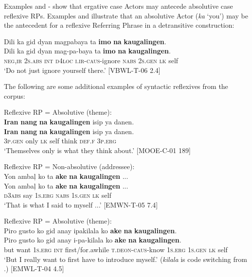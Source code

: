 Examples  and - show that ergative case Actors may antecede absolutive case reflexive RPs. Examples  and  illustrate that an absolutive Actor (\textit{ka} ‘you’) may be the antecedent for a reflexive Referring Phrase in a detransitive construction:


\ea
\label{bkm:Ref501865097}
Dili  ka  gid  dyan  magpabaya  ta  \textbf{imo}  \textbf{na}  \textbf{kaugalingen}. \\\smallskip
\gll Dili  ka  gid  dyan  mag-pa-baya  ta  \textbf{imo}  \textbf{na}  \textbf{kaugalingen}. \\
\textsc{neg,ir}  2\textsc{s.abs}  \textsc{int}  \textsc{d}4\textsc{loc}  \textsc{i.ir}-\textsc{caus}-ignore  \textsc{nabs}  2\textsc{s.gen}  \textsc{lk}  self \\
\glt ‘Do not just ignore yourself there.’ [VBWL-T-06 2.4]
\z

The following are some additional examples of syntactic reflexives from the corpus:

\ea
\label{bkm:Ref118618251}
Reflexive RP = Absolutive (theme): \\
\textbf{Iran}  \textbf{nang}  \textbf{na}  \textbf{kaugalingen} isip  ya  danen. \\\smallskip
\gll \textbf{Iran}  \textbf{nang}  \textbf{na}  \textbf{kaugalingen} isip  ya  danen. \\
 3\textsc{p.gen}  only  \textsc{lk}  self  think  \textsc{def.f}  3\textsc{p.erg} \\
\glt ‘Themselves only is what they think about.’ [MOOE-C-01 189]
\z

\ea
Reflexive RP = Non-absolutive (addressee): \\
Yon  ambaļ  ko  ta  \textbf{ake}  \textbf{na}  \textbf{kaugalingen} ... \\\smallskip
\gll Yon  ambaļ  ko  ta  \textbf{ake}  \textbf{na}  \textbf{kaugalingen} ... \\
\textsc{d}3\textsc{abs}  say  1\textsc{s.erg}  \textsc{nabs}  1\textsc{s.gen} \textsc{lk}  self \\
\glt ‘That is what I said to myself ...’ [EMWN-T-05 7.4]
\z

\ea
\label{bkm:Ref118618196}
Reflexive RP = Absolutive (theme): \\
Piro  gusto  ko  gid  anay  ipakilala  ko  \textbf{ake}  \textbf{na}  \textbf{kaugalingen}. \\\smallskip
\gll Piro  gusto  ko  gid  anay  i-pa-kilala  ko  \textbf{ake}  \textbf{na}  \textbf{kaugalingen}. \\
but  want  1\textsc{s.erg}  \textsc{int}  first/for.awhile  \textsc{t.deon}-\textsc{caus}-know  1\textsc{s.erg}  1\textsc{s.gen}  \textsc{lk}  self \\
\glt ‘But I really want to first have to introduce myself.’ (\textit{kilala} is code switching from .) [EMWL-T-04 4.5]
\z

